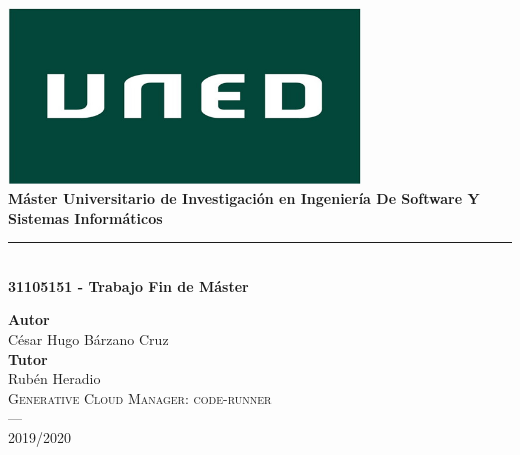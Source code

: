 \begin{titlepage}
 
 
\newlength{\centeroffset}
\setlength{\centeroffset}{-0.5\oddsidemargin}
\addtolength{\centeroffset}{0.5\evensidemargin}
\thispagestyle{empty}

\noindent\hspace*{\centeroffset}\begin{minipage}{\textwidth}

\centering
\includegraphics[width=0.7\textwidth]{imagenes/Logo-uned.jpg}\\[1.1cm]


{\Huge\bfseries Máster Universitario de Investigación en Ingeniería De Software Y Sistemas Informáticos\\
}
\noindent\rule[-1ex]{\textwidth}{3pt}\\[3.5ex]
{\large\bfseries 31105151 - Trabajo Fin de Máster}
\end{minipage}

\vspace{2.5cm}
\noindent\hspace*{\centeroffset}\begin{minipage}{\textwidth}
\centering

\textbf{Autor}\\ {César Hugo Bárzano Cruz}\\[2.5ex]
\textbf{Tutor}\\ {Rubén Heradio}\\[2.5ex]


\textsc{Generative Cloud Manager: code-runner}\\
\textsc{---}\\
2019/2020
\end{minipage}
\end{titlepage}

